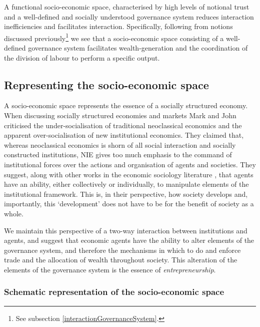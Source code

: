 A functional socio-economic space, characterised by high levels of notional trust and a well-defined and socially understood governance system reduces interaction inefficiencies and facilitates interaction. Specifically, following from notions discussed previously\footnote{See subsection \ref{interactionGovernanceSystem}. } we see that a socio-economic space consisting of a well-defined governance system facilitates wealth-generation and the coordination of the division of labour to perform a specific output.

\subsection{Representing the socio-economic space}

A socio-economic space represents the essence of a socially structured economy. When discussing socially structured economies and markets Mark \citet{Granovetter1985, Granovetter2005} and John \citet{Lie1997} criticised the under-socialisation of traditional neoclassical economics and the apparent over-socialisation of new institutional economics. They claimed that, whereas neoclassical economics is shorn of all social interaction and socially constructed institutions, NIE gives too much emphasis to the command of institutional forces over the actions and organisation of agents and societies. They suggest, along with other works in the economic sociology literature \citep{DiMaggio1988, Swedberg2000, Battilana2006}, that agents have an ability, either collectively or individually, to manipulate elements of the institutional framework. This is, in their perspective, how society develops and, importantly, this `development' does not have to be for the benefit of society as a whole.

We maintain this perspective of a two-way interaction between institutions and agents, and suggest that economic agents have the ability to alter elements of the governance system, and therefore the mechanisms in which to do and enforce trade and the allocation of wealth throughout society. This alteration of the elements of the governance system is the essence of \emph{entrepreneurship}.

\subsubsection{Schematic representation of the socio-economic space} \label{subsubsec:schematicRepresentation}

